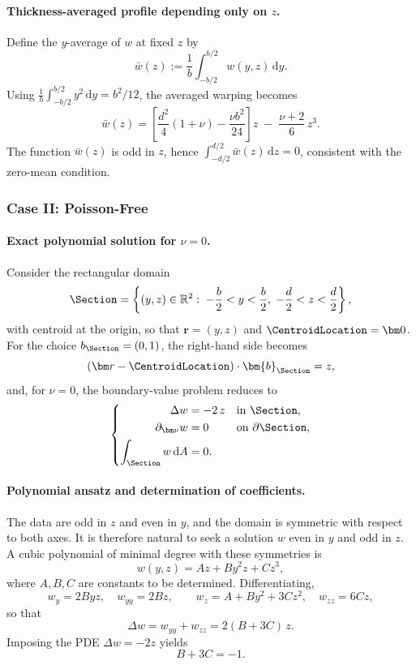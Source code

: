 \paragraph{Thickness-averaged profile depending only on $z$.}
Define the $y$-average of $w$ at fixed $z$ by
\[
\bar w(z) := \frac{1}{b}\int_{-b/2}^{b/2} w(y,z)\,\mathrm dy.
\]
Using $\frac1b\int_{-b/2}^{b/2} y^2\,\mathrm dy = b^2/12$, the averaged warping becomes
\[
\bar w(z)
= \left[\frac{d^2}{4}(1+\nu)-\frac{\nu b^2}{24}\right]z
\;-\;\frac{\nu+2}{6}\,z^3.
\]
The function $\bar w(z)$ is odd in $z$, hence $\int_{-d/2}^{d/2}\bar w(z)\,\mathrm dz=0$, consistent with the zero-mean condition.

\subsubsection{Case II: Poisson-Free}
\paragraph{Exact polynomial solution for $\nu=0$.}
Consider the rectangular domain
\[
\Section = \left\{(y,z)\in\mathbb R^2:\; -\frac b2<y<\frac b2,\; -\frac d2<z<\frac d2\right\},
\]
with centroid at the origin, so that $\bm r=(y,z)$ and $\CentroidLocation=\bm 0$.
For the choice $b_{\Section}=(0,1)$, the right-hand side becomes
\[
(\bm r-\CentroidLocation)\cdot \bm{b}_{\Section} = z,
\]
and, for $\nu=0$, the boundary-value problem reduces to
\[
\left\{
\begin{aligned}
\Delta w &= -2\, z && \text{in } \Section,\\
\partial_{\bm\nu}w &= 0 && \text{on } \partial\Section,\\
\displaystyle \int_\Section w\,\mathrm dA &= 0.
\end{aligned}
\right.
\]

\paragraph{Polynomial ansatz and determination of coefficients.}
The data are odd in $z$ and even in $y$, and the domain is symmetric with respect to both axes. It is therefore natural to seek a solution $w$ even in $y$ and odd in $z$. A cubic polynomial of minimal degree with these symmetries is
\[
w(y,z) = A z + B y^2 z + C z^3,
\]
where $A,B,C$ are constants to be determined. Differentiating,
\[
w_y = 2Byz,\quad w_{yy}=2Bz,\qquad
w_z = A + B y^2 + 3Cz^2,\quad w_{zz}=6Cz,
\]
so that
\[
\Delta w = w_{yy}+w_{zz} = 2(B+3C)\,z.
\]
Imposing the PDE $\Delta w=-2z$ yields
\[
B+3C = -1. \tag{$\dagger$}
\]

